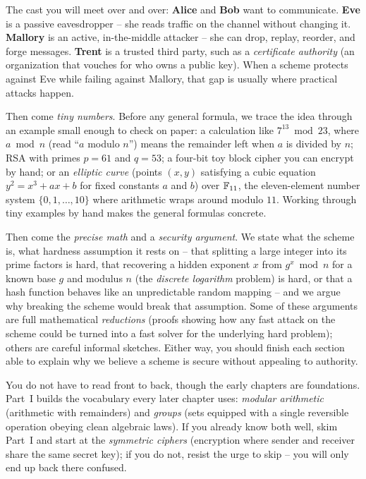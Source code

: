 \begin{marginnotebox}
The cast you will meet over and over: \textbf{Alice} and \textbf{Bob} want to communicate. \textbf{Eve} is a passive eavesdropper -- she reads traffic on the channel without changing it. \textbf{Mallory} is an active, in-the-middle attacker -- she can drop, replay, reorder, and forge messages. \textbf{Trent} is a trusted third party, such as a \emph{certificate authority} (an organization that vouches for who owns a public key). When a scheme protects against Eve while failing against Mallory, that gap is usually where practical attacks happen.
\end{marginnotebox}

Then come \emph{tiny numbers}. Before any general formula, we trace the idea through an example small enough to check on paper: a calculation like $7^{13} \bmod 23$, where $a \bmod n$ (read ``$a$ modulo $n$'') means the remainder left when $a$ is divided by $n$; RSA with primes $p = 61$ and $q = 53$; a four-bit toy block cipher you can encrypt by hand; or an \emph{elliptic curve} (points $(x, y)$ satisfying a cubic equation $y^2 = x^3 + ax + b$ for fixed constants $a$ and $b$) over $\mathbb{F}_{11}$, the eleven-element number system $\{0, 1, \dots, 10\}$ where arithmetic wraps around modulo $11$. Working through tiny examples by hand makes the general formulas concrete.

Then come the \emph{precise math} and a \emph{security argument}. We state what the scheme is, what hardness assumption it rests on -- that splitting a large integer into its prime factors is hard, that recovering a hidden exponent $x$ from $g^x \bmod n$ for a known base $g$ and modulus $n$ (the \emph{discrete logarithm} problem) is hard, or that a hash function behaves like an unpredictable random mapping -- and we argue why breaking the scheme would break that assumption. Some of these arguments are full mathematical \emph{reductions} (proofs showing how any fast attack on the scheme could be turned into a fast solver for the underlying hard problem); others are careful informal sketches. Either way, you should finish each section able to explain why we believe a scheme is secure without appealing to authority.

You do not have to read front to back, though the early chapters are foundations. Part~I builds the vocabulary every later chapter uses: \emph{modular arithmetic} (arithmetic with remainders) and \emph{groups} (sets equipped with a single reversible operation obeying clean algebraic laws). If you already know both well, skim Part~I and start at the \emph{symmetric ciphers} (encryption where sender and receiver share the same secret key); if you do not, resist the urge to skip -- you will only end up back there confused.

